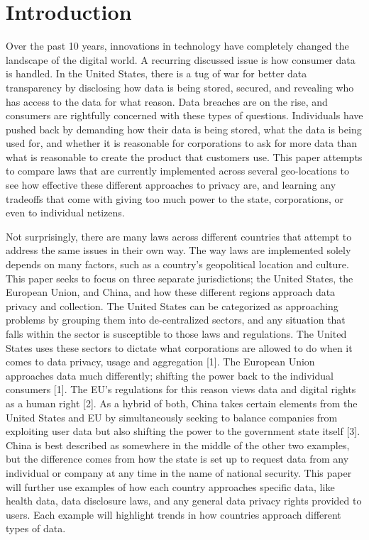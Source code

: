 \documentclass[conference]{IEEEtran}
\begin{document}
\section{Introduction}
 Over the past 10 years, innovations in technology have completely changed the landscape of the digital world. A recurring discussed issue is how consumer data is handled. In the United States, there is a tug of war for better data transparency by disclosing how data is being stored, secured, and revealing who has access to the data for what reason. Data breaches are on the rise, and consumers are rightfully concerned with these types of questions. Individuals have pushed back by demanding how their data is being stored, what the data is being used for, and whether it is reasonable for corporations to ask for more data than what is reasonable to create the product that customers use. This paper attempts to compare laws that are currently implemented across several geo-locations to see how effective these different approaches to privacy are, and learning any tradeoffs that come with giving too much power to the state, corporations, or even to individual netizens.

Not surprisingly, there are many laws across different countries that attempt to address the same issues in their own way. The way laws are implemented solely depends on many factors, such as a country's geopolitical location and culture. This paper seeks to focus on three separate jurisdictions; the United States, the European Union, and China, and how these different regions approach data privacy and collection. The United States can be categorized as approaching problems by grouping them into de-centralized sectors, and any situation that falls within the sector is susceptible to those laws and regulations. The United States uses these sectors to dictate what corporations are allowed to do when it comes to data privacy, usage and aggregation [1]. The European Union approaches data much differently; shifting the power back to the individual consumers [1]. The EU's regulations for this reason views data and digital rights as a human right [2]. As a hybrid of both, China takes certain elements from the United States and EU by simultaneously seeking to balance companies from exploiting user data but also shifting the power to the government state itself [3]. China is best described as somewhere in the middle of the other two examples, but the difference comes from how the state is set up to request data from any individual or company at any time in the name of national security. This paper will further use examples of how each country approaches specific data, like health data, data disclosure laws, and any general data privacy rights provided to users. Each example will highlight trends in how countries approach different types of data. 
\end{document}
